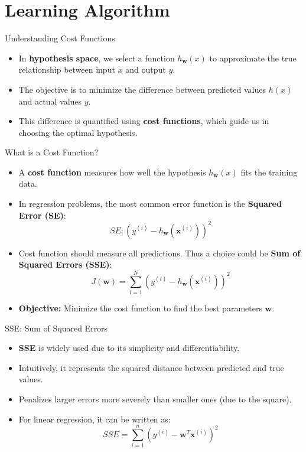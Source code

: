 \documentclass[serif, aspectratio=169]{beamer}
\begin{document}
\section{Learning Algorithm}
\begin{frame}{Understanding Cost Functions}
    \begin{itemize}
        \item In \textbf{hypothesis space}, we select a function \( h_{\mathbf{w}}(x) \) to approximate the true relationship between input \( x \) and output \( y \).
        \item The objective is to minimize the difference between predicted values \( h(x) \) and actual values \( y \).
        \item This difference is quantified using \textbf{cost functions}, which guide us in choosing the optimal hypothesis.
    \end{itemize}
\end{frame}

\begin{frame}{What is a Cost Function?}
    \begin{itemize}
        \item A \textbf{cost function} measures how well the hypothesis \( h_{\mathbf{w}}(x)  \) fits the training data.
        \item In regression problems, the most common error function is the \textbf{Squared Error (SE)}:
            \[
            SE: \left( y^{(i)} - h_{\mathbf{w}}(\mathbf{x}^{(i)}) \right)^2
            \]
        \item Cost function should measure all predictions. Thus a choice could be \textbf{Sum of Squared Errors (SSE)}:
        \[
        J(\mathbf{w}) = \sum_{i=1}^{N} \left( y^{(i)} - h_{\mathbf{w}}(\mathbf{x}^{(i)} ) \right)^2
        \]
        \item \textbf{Objective:} Minimize the cost function to find the best parameters \( \mathbf{w} \).

    \end{itemize}

\end{frame}

\begin{frame}{SSE: Sum of Squared Errors}
    \begin{itemize}
        \item \textbf{SSE} is widely used due to its simplicity and differentiability.
        \item Intuitively, it represents the squared distance between predicted and true values.
        \item Penalizes larger errors more severely than smaller ones (due to the square).
        \item For linear regression, it can be written as:
        \[
        SSE = \sum_{i=1}^{n} \left( y^{(i)} - \mathbf{w}^T \mathbf{x}^{(i)} \right)^2
        \]
    \end{itemize}
\end{frame}
\end{document}
